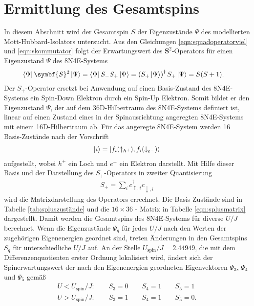 \section{Ermittlung des Gesamtspins}
\label{sec:spin}

In diesem Abschnitt wird der Gesamtspin $S$ der Eigenzustände $\Psi$ des modellierten Mott-Hubbard-Isolators untersucht.
Aus den Gleichungen \eqref{eqn:squadoperatorviel} und \eqref{eqn:skommutator} folgt der Erwartungswert des $\symbf{S}^2$-Operators für einen Eigenzustand $\Psi$ des 8N4E-Systems
\begin{align}
  \bra{\Psi} \symbf{S}^2 \ket{\Psi} & = \bra{\Psi} S_- S_+ \ket{\Psi} = \left(S_+ \ket{\Psi}\right)^\dag S_+ \ket{\Psi} = S(S+1).
  \label{eqn:spin8N4E}
\end{align}
Der $S_+$-Operator ersetzt bei Anwendung auf einen Basis-Zustand des 8N4E-Systems ein Spin-Down Elektron durch ein Spin-Up Elektron. Somit bildet er den Eigenzustand $\Psi$, der auf dem 36D-Hilbertraum des 8N4E-Systems definiert ist, linear
auf einen Zustand eines in der Spinausrichtung angeregten 8N4E-Systems mit einem 16D-Hilbertraum ab. Für das angeregte 8N4E-System werden 16 Basis-Zustände nach der Vorschrift
\begin{align}
  \ket{i} = \ket{f_i(\uparrow_{h^+}),f_i(\downarrow_{e^-})}
  \label{eqn:8N4Espinvorschrift}
\end{align}
aufgestellt, wobei $h^+$ ein Loch und $e^-$ ein Elektron darstellt.
Mit Hilfe dieser Basis und der Darstellung des $S_+$-Operators in zweiter Quantisierung
\begin{align}
  S_+ = \sum_{i} c_{\uparrow,i}^\dag c_{\downarrow,i}^{\phantom{\dag}}
\end{align}
wird die Matrixdarstellung des Operators errechnet. Die Basis-Zustände sind in Tabelle \ref{tab:spluszustände} und die $16 \times 36$ - Matrix in Tabelle \eqref{eqn:splusmatrix} dargestellt.
Damit werden die Gesamtspins des 8N4E-Systems für diverse $U/J$ berechnet.
Wenn die Eigenzustände $\Psi_q$ für jedes $U/J$ nach den Werten der zugehörigen Eigenenergien geordnet sind, treten Änderungen in den Gesamtspins $S_q$ für unterschiedliche $U/J$ auf.
An der Stelle $U_\text{spin}/J = 2.44949$, die mit dem Differenzenquotienten erster Ordnung lokalisiert wird, ändert sich der Spinerwartungswert der nach den Eigenenergien geordneten Eigenvektoren $\Psi_3$, $\Psi_4$ und $\Psi_5$ gemäß
\begin{align*}
  U < U_\text{spin}/J: \quad\quad S_3=0 \quad\quad S_4=1 \quad\quad S_5=1 \\
  U > U_\text{spin}/J: \quad\quad S_3=1 \quad\quad S_4=1 \quad\quad S_5=0.
\end{align*}
